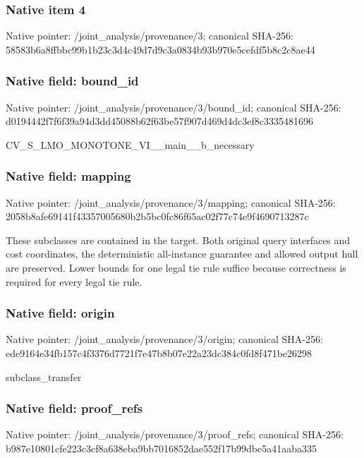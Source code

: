 \documentclass[10pt,a4paper]{article}
\begin{document}
\subsubsection{Native item 4}
Native pointer: /joint\_\allowbreak{}analysis/provenance/3; canonical SHA-256: 58583b6a8ffbbc99b1b23c3d4c49d7d9c3a0834b93b970e5cefdf5b8c2c8ae44

\subsubsection{Native field: bound\_\allowbreak{}id}
Native pointer: /joint\_\allowbreak{}analysis/provenance/3/bound\_\allowbreak{}id; canonical SHA-256: d0194442f7f6f39a94d3dd45088b62f63be57f907d469d4dc3ef8c3335481696

\begingroup\raggedright\sloppy CV\_\allowbreak{}S\_\allowbreak{}LMO\_\allowbreak{}MONOTONE\_\allowbreak{}VI\_\allowbreak{}\_\allowbreak{}main\_\allowbreak{}\_\allowbreak{}b\_\allowbreak{}necessary\par\endgroup

\subsubsection{Native field: mapping}
Native pointer: /joint\_\allowbreak{}analysis/provenance/3/mapping; canonical SHA-256: 2058b8afe69141f43357005680b2b5bc0fc86f65ac02f77c74e9f4690713287c

\begingroup\raggedright\sloppy These subclasses are contained in the target. Both original query interfaces and cost coordinates,\allowbreak{} the deterministic all-instance guarantee and allowed output hull are preserved. Lower bounds for one legal tie rule suffice because correctness is required for every legal tie rule.\par\endgroup

\subsubsection{Native field: origin}
Native pointer: /joint\_\allowbreak{}analysis/provenance/3/origin; canonical SHA-256: ede9164e34fb157c4f3376d7721f7e47b8b07e22a23dc384c0fd8f471be26298

\begingroup\raggedright\sloppy subclass\_\allowbreak{}transfer\par\endgroup

\subsubsection{Native field: proof\_\allowbreak{}refs}
Native pointer: /joint\_\allowbreak{}analysis/provenance/3/proof\_\allowbreak{}refs; canonical SHA-256: b987e10801cfe223c3cf8a638eba9bb7016852dae552f17b99dbe5a41aaba335
\end{document}
